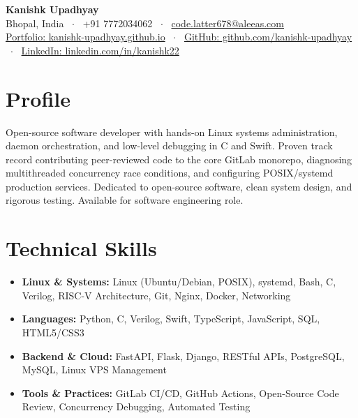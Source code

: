 \documentclass[10pt,a4paper]{article}
\begin{document}
\begin{center}
    {\huge \textbf{Kanishk Upadhyay}} \\ \vspace{2pt}
    Bhopal, India \ $\cdot$ \ +91 7772034062 \ $\cdot$ \ \href{mailto:code.latter678@aleeas.com}{code.latter678@aleeas.com} \\ \vspace{2pt}
    \href{https://kanishk-upadhyay.github.io/}{Portfolio: kanishk-upadhyay.github.io} \ $\cdot$ \ 
    \href{https://github.com/kanishk-upadhyay}{GitHub: github.com/kanishk-upadhyay} \ $\cdot$ \ 
    \href{https://linkedin.com/in/kanishk22}{LinkedIn: linkedin.com/in/kanishk22}
\end{center}

\vspace{-6pt}
\section{Profile}
Open-source software developer with hands-on Linux systems administration, daemon orchestration, and low-level debugging in C and Swift. Proven track record contributing peer-reviewed code to the core GitLab monorepo, diagnosing multithreaded concurrency race conditions, and configuring POSIX/systemd production services. Dedicated to open-source software, clean system design, and rigorous testing. Available for software engineering role.

\section{Technical Skills}
\begin{itemize}
    \item \textbf{Linux \& Systems:} Linux (Ubuntu/Debian, POSIX), systemd, Bash, C, Verilog, RISC-V Architecture, Git, Nginx, Docker, Networking
    \item \textbf{Languages:} Python, C, Verilog, Swift, TypeScript, JavaScript, SQL, HTML5/CSS3
    \item \textbf{Backend \& Cloud:} FastAPI, Flask, Django, RESTful APIs, PostgreSQL, MySQL, Linux VPS Management
    \item \textbf{Tools \& Practices:} GitLab CI/CD, GitHub Actions, Open-Source Code Review, Concurrency Debugging, Automated Testing
\end{itemize}
\end{document}
